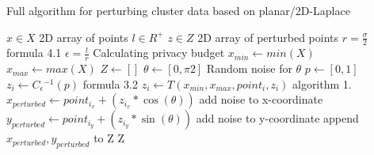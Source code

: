 \begin{algorithm}[H]
  \caption{Full algorithm for perturbing cluster data based on planar/2D-Laplace \citep{DBLP:journals/corr/abs-1212-1984}}\label{alg:rq1}
  \begin{algorithmic}
    \Require $x \in X$  \Comment 2D array of points
    \Require $l \in R^ +$
    \Ensure $z \in Z$ \Comment 2D array of perturbed points
    \State $r = \frac{\sigma}{2}$ \Comment formula 4.1
    \State $\epsilon = \frac{l}{r}$ \Comment Calculating privacy budget \citep{DBLP:journals/corr/abs-1212-1984}
    \State $x_{min} \gets min(X)$
    \State $x_{max} \gets max(X)$
    \State $Z \gets []$
    \State $\theta \gets [0, \pi2]$       \Comment Random noise for $\theta$
    \State $p \gets [0, 1]$
    \State $z_i \gets C{_\epsilon}{^{-1}}(p)$       \Comment formula 3.2
    \State $z_i \gets T(x_{min}, x_{max}, point_i, z_i)$ \Comment algorithm 1.
    \State $x_{perturbed} \gets point_{i_x} + (z_{i_x} * \cos(\theta)) $ \Comment add noise to x-coordinate
    \State $y_{perturbed} \gets point_{i_y} + (z_{i_y} * \sin(\theta)) $ \Comment add noise to y-coordinate
    \State append $x_{perturbed}, y_{perturbed}$ to Z
    \EndFor
    \State \Return Z
  \end{algorithmic}
\end{algorithm}
